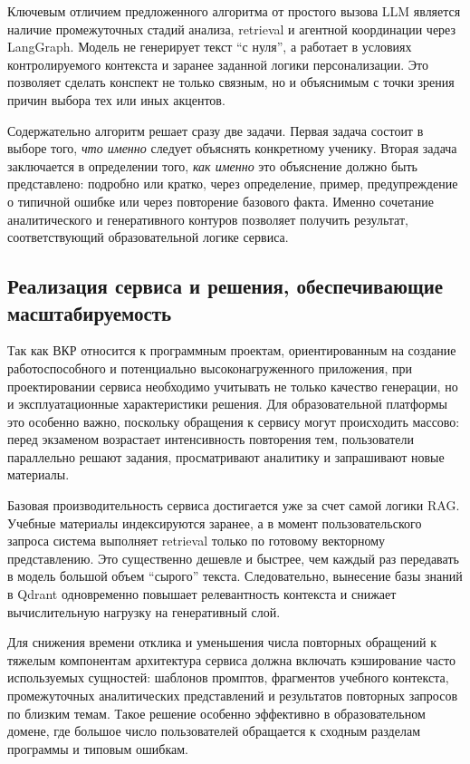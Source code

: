 \documentclass[a4paper,12pt]{extarticle}
\begin{document}
Ключевым отличием предложенного алгоритма от простого вызова LLM является наличие 
промежуточных стадий анализа, retrieval и агентной координации через LangGraph. 
Модель не генерирует текст ``с нуля'', 
а работает в условиях контролируемого контекста и заранее заданной логики персонализации. 
Это позволяет сделать конспект не только связным, но и объяснимым с точки зрения причин 
выбора тех или иных акцентов.

Содержательно алгоритм решает сразу две задачи. Первая задача состоит в выборе того, 
\textit{что именно} следует объяснять конкретному ученику. Вторая задача заключается 
в определении того, \textit{как именно} это объяснение должно быть представлено: 
подробно или кратко, через определение, пример, предупреждение о типичной ошибке или 
через повторение базового факта. Именно сочетание аналитического и генеративного 
контуров позволяет получить результат, соответствующий образовательной логике сервиса.

\subsection{Реализация сервиса и решения, обеспечивающие масштабируемость}

Так как ВКР относится к программным проектам, ориентированным на создание 
работоспособного и потенциально высоконагруженного приложения, при проектировании 
сервиса необходимо учитывать не только качество генерации, но и эксплуатационные 
характеристики решения. Для образовательной платформы это особенно важно, 
поскольку обращения к сервису могут происходить массово: перед экзаменом возрастает 
интенсивность повторения тем, пользователи параллельно решают задания, просматривают 
аналитику и запрашивают новые материалы.

Базовая производительность сервиса достигается уже за счет самой логики RAG. Учебные 
материалы индексируются заранее, а в момент пользовательского запроса система выполняет 
retrieval только по готовому векторному представлению. Это существенно дешевле и быстрее, 
чем каждый раз передавать в модель большой объем ``сырого'' текста. 
Следовательно, вынесение базы знаний в Qdrant одновременно повышает релевантность контекста 
и снижает вычислительную нагрузку на генеративный слой.

Для снижения времени отклика и уменьшения числа повторных обращений к тяжелым компонентам 
архитектура сервиса должна включать кэширование часто используемых сущностей: шаблонов 
промптов, фрагментов учебного контекста, промежуточных аналитических представлений и 
результатов повторных запросов по близким темам. Такое решение особенно эффективно в 
образовательном домене, где большое число пользователей обращается к сходным разделам 
программы и типовым ошибкам.
\end{document}
